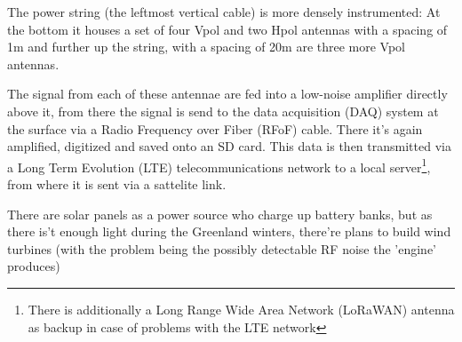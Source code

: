 \documentclass[11pt,a4paper,faculty=we,language=en,doctype=report]{cls/ugent-doc}
\begin{document}
The power string (the leftmost vertical cable) is more densely instrumented: At the bottom it houses a set of four Vpol and two Hpol antennas with a spacing of 1m and further up the string, with a spacing of 20m are three more Vpol antennas.

The signal from each of these antennae are fed into a low-noise amplifier directly above it, from there the signal is send to the data acquisition (DAQ) system at the surface via a Radio Frequency over Fiber (RFoF) cable. There it's again amplified, digitized and saved onto an SD card. This data is then transmitted via a Long Term Evolution (LTE) telecommunications network to a local server\footnote{There is additionally a Long Range Wide Area Network (LoRaWAN) antenna as backup in case of problems with the LTE network}, from where it is sent via a sattelite link.

There are solar panels as a power source who charge up battery banks, but as there is't enough light during the Greenland winters, there're plans to build wind turbines (with the problem being the possibly detectable RF noise the 'engine' produces)
\end{document}
